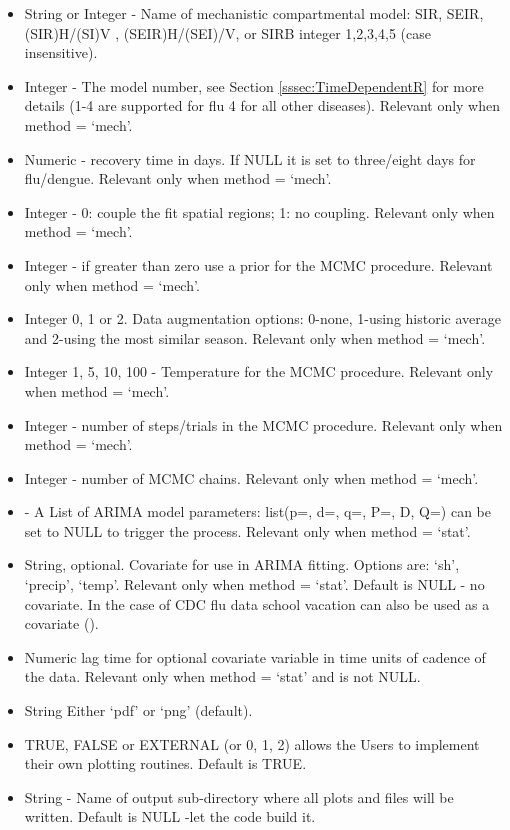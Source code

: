 \documentclass[a4paper]{article}
\begin{document}
\begin{itemize}
\item {} String or Integer - Name of mechanistic compartmental model: SIR, SEIR, (SIR)H/(SI)V ,  (SEIR)H/(SEI)/V, or SIRB integer 1,2,3,4,5  (case insensitive).
\item {}  Integer - The model number, see Section \ref{sssec:TimeDependentR} for more details (1-4 are supported for flu 4 for all other diseases). Relevant only when method = `mech'.
\item {} Numeric -  recovery time in days.  If NULL it is set to three/eight days for flu/dengue. Relevant only when method = `mech'.
\item {} Integer - 0: couple the fit spatial regions; 1: no coupling. Relevant only when method = `mech'.
\item {} Integer - if greater than zero use a prior for the MCMC procedure. Relevant only when method = `mech'.
\item {} Integer 0, 1 or 2. Data augmentation options: 0-none, 1-using historic average and 2-using the most similar season. Relevant only when method = `mech'.
\item {} Integer 1, 5, 10, 100 - Temperature for the MCMC procedure.    Relevant only when method = `mech'.
\item {} Integer - number of steps/trials in the MCMC procedure. Relevant only when method = `mech'.
\item {} Integer - number of MCMC chains. Relevant only when method = `mech'.
\item {}  - A List of ARIMA model parameters: list(p=, d=, q=, P=, D, Q=) can be set to NULL to trigger the
 process. Relevant only when method = `stat'.
\item {} String, optional.  Covariate for use in ARIMA fitting.  Options are: `sh', `precip', `temp'. Relevant only when method = `stat'. Default is NULL - no covariate.  In the case of CDC flu data school vacation can also be used as a covariate ().
\item {} Numeric lag time for optional covariate variable in time units of cadence of the data. Relevant only when method = `stat' and  is not NULL.
\item {}  String Either `pdf' or `png' (default).
\item {} TRUE, FALSE or EXTERNAL (or 0, 1, 2) allows the Users to implement their own plotting routines. Default is TRUE.
\item {} String - Name of output sub-directory where all plots and files will be written.  Default is NULL -let the code build it.
\end{itemize}

\clearpage

%

\end{document}
